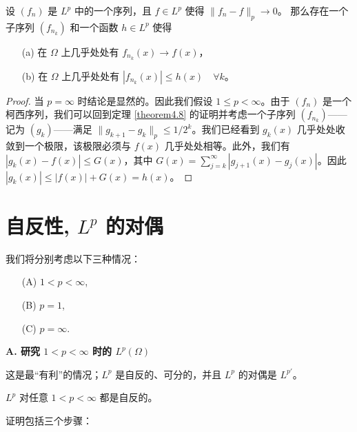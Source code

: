 \begin{theorem}\label{theorem4.9}
设 $(f_n)$ 是 $L^p$ 中的一个序列，且 $f \in L^p$ 使得 $\|f_n - f\|_p \to 0$。
那么存在一个子序列 $(f_{n_k})$ 和一个函数 $h \in L^p$ 使得
\begin{itemize}
    \item[(a)] 在 $\Omega$ 上几乎处处有 $f_{n_k}(x) \to f(x)$，
    \item[(b)] 在 $\Omega$ 上几乎处处有 $|f_{n_k}(x)| \le h(x) \quad \forall k$。
\end{itemize}
\end{theorem}
\begin{proof}
当 $p=\infty$ 时结论是显然的。因此我们假设 $1 \le p < \infty$。由于 $(f_n)$ 是一个柯西序列，我们可以回到定理 \ref{theorem4.8} 的证明并考虑一个子序列 $(f_{n_k})$——记为 $(g_k)$——满足 $\|g_{k+1} - g_k\|_p \le 1/2^k$。我们已经看到 $g_k(x)$ 几乎处处收敛到一个极限，该极限必须与 $f(x)$ 几乎处处相等。此外，我们有 $|g_k(x) - f(x)| \le G(x)$，其中 $G(x) = \sum_{j=k}^\infty |g_{j+1}(x) - g_j(x)|$。因此 $|g_k(x)| \le |f(x)| + G(x) = h(x)$。
\end{proof}

\section{自反性, $L^p$ 的对偶}

我们将分别考虑以下三种情况：
\begin{itemize}
    \item[(A)] $1 < p < \infty$,
    \item[(B)] $p=1$,
    \item[(C)] $p=\infty$.
\end{itemize}

\textbf{A. 研究 $1 < p < \infty$ 时的 $L^p(\Omega)$}

这是最“有利”的情况；$L^p$ 是自反的、可分的，并且 $L^p$ 的对偶是 $L^{p'}$。

\begin{theorem}\label{theorem4.10}
$L^p$ 对任意 $1 < p < \infty$ 都是自反的。
\end{theorem}

证明包括三个步骤：


